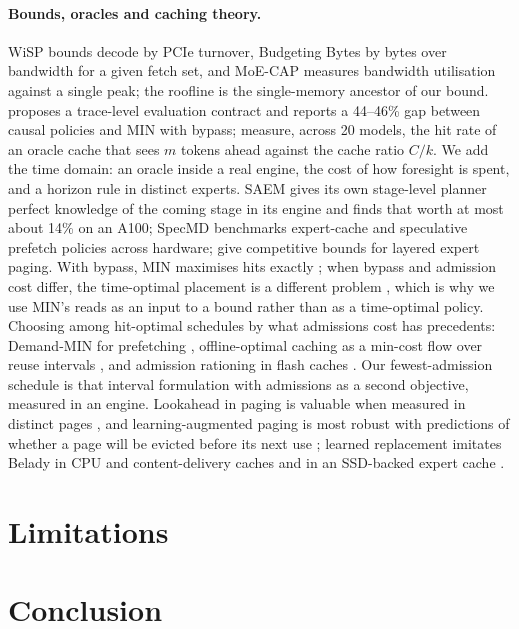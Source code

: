 \paragraph{Bounds, oracles and caching theory.} WiSP \citep{wisp2026} bounds decode by PCIe turnover, Budgeting
Bytes \citep{budgetingbytes2026} by bytes over bandwidth for a given fetch set, and MoE-CAP \citep{moecap} measures
bandwidth utilisation against a single peak; the roofline \citep{williams2009roofline} is the single-memory ancestor of
our bound. \citet{zhang2026reproducible} proposes a trace-level evaluation contract and reports a 44--46\% gap
between causal policies and MIN with bypass; \citet{liang2026lrc} measure, across 20 models, the hit rate
of an oracle cache that sees $m$ tokens ahead against the cache ratio $C/k$. We add the time domain: an oracle inside a
real engine, the cost of how foresight is spent, and a horizon rule in distinct experts. SAEM \citep{saem2026}
gives its own stage-level planner perfect knowledge of the coming stage in its engine and finds that worth at most
about 14\% on an A100; SpecMD \citep{specmd} benchmarks expert-cache and speculative prefetch policies across hardware; \citet{angelopoulos2025cache} give competitive bounds for layered expert paging. With bypass, MIN maximises hits
exactly \citep{carlisle1995kcoloring,jain2016hawkeye}; when bypass and admission cost differ, the time-optimal placement
is a different problem \citep{bypassopt}, which is why we use MIN's reads as an input to a bound rather than as a
time-optimal policy. Choosing among hit-optimal schedules by what admissions cost has precedents: Demand-MIN for
prefetching \citep{jain2018prefetch}, offline-optimal caching as a min-cost flow over reuse
intervals \citep{berger2018foo}, and admission rationing in flash caches \citep{flashield2019}. Our fewest-admission
schedule is that interval formulation with admissions as a second objective, measured in an engine. Lookahead in paging is valuable when measured in distinct pages \citep{albers1997lookahead,breslauer1995lookahead},
and learning-augmented paging is most robust with predictions of whether a page will be evicted before its next
use \citep{antoniadis2023succinct}; learned replacement imitates Belady in CPU and content-delivery
caches \citep{jain2016hawkeye,song2020lrb} and in an SSD-backed expert cache \citep{flashmoe2026}.

\section{Limitations}\label{sec:limits}

\section{Conclusion}

